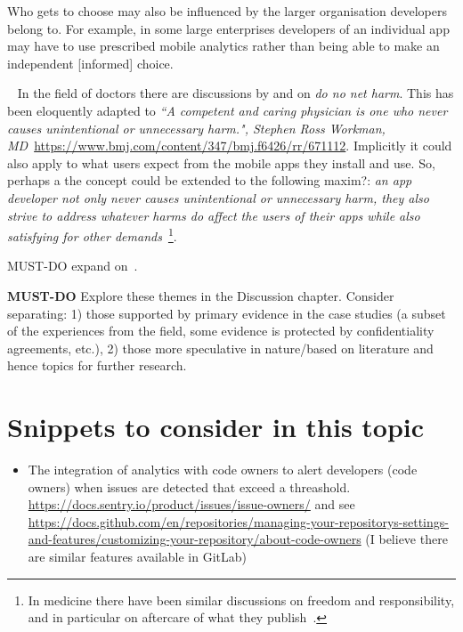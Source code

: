 Who gets to choose may also be influenced by the larger organisation developers belong to. For example, in some large enterprises developers of an individual app may have to use prescribed mobile analytics rather than being able to make an independent [informed] choice.


~\label{newthought-do-no-net-harm}
In the field of doctors there are discussions by \citealt{Schuenemann2011_guidelines2_0_do_no_net_harm} and \citealt{Sokolf6426_2013_first_do_no_harm_revisited} on \emph{do no net harm}. This has been eloquently adapted to \emph{``A competent and caring physician is one who never causes unintentional or unnecessary harm.", Stephen Ross Workman, MD}~\url{https://www.bmj.com/content/347/bmj.f6426/rr/671112}. Implicitly it could also apply to what users expect from the mobile apps they install and use. So, perhaps a the concept could be extended to the following maxim?: \emph{an app developer not only never causes unintentional or unnecessary harm, they also strive to address whatever harms do affect the users of their apps while also satisfying for other demands}~\footnote{In medicine there have been similar discussions on freedom and responsibility, and in particular on aftercare of what they publish~\citep{rennie1998_freedom_and_responsibility_in_medical_publication}.}.

MUST-DO expand on~\citep{shklovski2014_leakiness_and_creepiness_in_app_space_perceptions_of_privacy_and_mobile_app_use, zhou2017_user_perceived_control_trust_etc_smartphone}.

\textbf{MUST-DO} Explore these themes in the Discussion chapter. Consider separating: 1) those supported by primary evidence in the case studies (a subset of the experiences from the field, some evidence is protected by confidentiality agreements, etc.), 2) those more speculative in nature/based on literature and hence topics for further research.


\section{Snippets to consider in this topic}

\begin{itemize}
    \item The integration of analytics with code owners to alert developers (code owners) when issues are detected that exceed a threashold. \url{https://docs.sentry.io/product/issues/issue-owners/} and see \url{https://docs.github.com/en/repositories/managing-your-repositorys-settings-and-features/customizing-your-repository/about-code-owners} (I believe there are similar features available in GitLab)
\end{itemize}